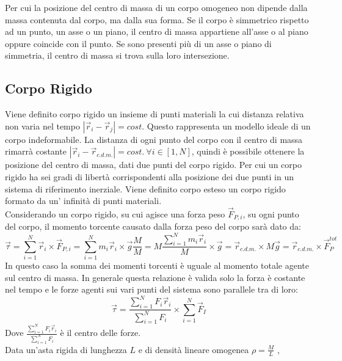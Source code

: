 \documentclass{article}
\numberwithin{equation}{subsection}
\begin{document}
Per cui la posizione del centro di massa di un corpo omogeneo non dipende dalla massa contenuta dal corpo, ma dalla sua forma. Se il corpo è simmetrico rispetto ad un punto, un 
asse o un piano, il centro di massa appartiene all'asse o al piano oppure coincide con il punto. Se sono presenti più di un asse o piano di simmetria, il centro di massa 
si trova sulla loro intersezione. 

\subsection{Corpo Rigido}
Viene definito corpo rigido un insieme di punti materiali la 
cui distanza relativa non varia nel tempo $|\vec{r}_i-\vec{r}_j|=cost.$ Questo rappresenta un modello ideale di un corpo indeformabile. 
La distanza di ogni punto del corpo con il centro di massa 
rimarrà costante $|\vec{r}_i-\vec{r}_{c.d.m.}|=cost.\:\forall i\in[1,N]$, quindi è possibile ottenere la posizione 
del centro di massa, dati due punti del corpo rigido. Per cui un 
corpo rigido ha sei gradi di libertà corrispondenti alla posizione dei due punti in un sistema di riferimento inerziale.  
Viene definito corpo esteso un corpo rigido formato da un'
infinità di punti materiali.
\\
Considerando un corpo rigido, su cui agisce una forza peso $\vec{F}_{{P,i}}$, 
su ogni punto del corpo, il momento torcente causato dalla forza 
peso del corpo sarà dato da: 
\begin{equation*}
    \vec{\tau}=\displaystyle\sum_{i=1}^{N}\vec{r}_i\times\vec{F}_{P,i}=
    \displaystyle\sum_{i=1}^{N}m_i\vec{r}_i\times\vec{g}\frac{M}{M}=
    M\displaystyle\frac{\sum_{i=1}^{N}m_i\vec{r}_i}{M}\times\vec{g}=
    \vec{r}_{c.d.m.}\times M\vec{g}=
    \vec{r}_{c.d.m.}\times \vec{F}_P^{tot}
\end{equation*}
In questo caso la somma dei momenti torcenti è uguale al 
momento totale agente sul centro di massa. In generale questa 
relazione è valida solo la forza è costante nel tempo e le 
forze agenti sui vari punti del sistema sono parallele tra di loro: 
\begin{equation}
    \vec{\tau}=\displaystyle\frac{\sum_{i=1}^{N}F_i\vec{r}_i}{\sum_{i=1}^{N}F_i}\times\sum_{i=1}^{N}\vec{F}_I
\end{equation}
Dove $\displaystyle\frac{\sum_{i=1}^{N}F_i\vec{r}_i}{\sum_{i=1}^{N}F_i}$ 
è il centro delle forze.
\\
Data un'asta rigida di lunghezza $L$ e di densità lineare omogenea $\rho=\displaystyle\frac{M}{L}$ , 
\end{document}
